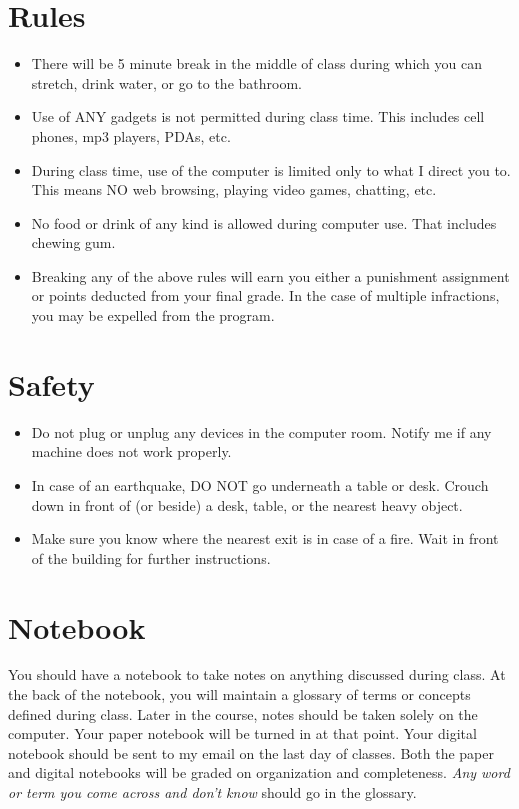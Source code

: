 \documentclass[11pt]{article}
\begin{document}
\section{Rules}

\begin{itemize}\itemsep.5pt
\item There will be 5 minute break in the middle of class during which you can stretch, drink water, or go to the bathroom.
\item Use of ANY gadgets is not permitted during class time.  This includes cell phones, mp3 players, PDAs, etc.
\item During class time, use of the computer is limited only to what I direct you to.  This means NO web browsing, playing video games, chatting, etc.
\item No food or drink of any kind is allowed during computer use.  That includes chewing gum.
\item Breaking any of the above rules will earn you either a punishment assignment or points deducted from your final grade.  In the case of multiple infractions, you may be expelled from the program.
\end{itemize}

\section{Safety}

\begin{itemize}\itemsep.5pt
\item Do not plug or unplug any devices in the computer room.  Notify me if any machine does not work properly.
\item In case of an earthquake, DO NOT go underneath a table or desk.  Crouch down in front of (or beside) a desk, table, or the nearest heavy object.
\item Make sure you know where the nearest exit is in case of a fire.  Wait in front of the building for further instructions.
\end{itemize}


\section{Notebook}

You should have a notebook to take notes on anything discussed during class.  At the back of the notebook, you will maintain a glossary of terms or concepts defined during class.  Later in the course, notes should be taken solely on the computer.  Your paper notebook will be turned in at that point.  Your digital notebook should be sent to my email on the last day of classes.  Both the paper and digital notebooks will be graded on organization and completeness.  \emph{Any word or term you come across and don't know} should go in the glossary.
\end{document}
